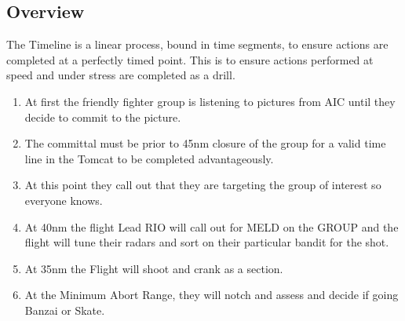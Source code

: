 
\subsection{Overview}



The Timeline is a linear process, bound in time segments, to ensure actions
are completed at a perfectly timed point. This is to ensure actions performed
at speed and under stress are completed as a drill.

\begin{enumerate}

  \item At first the friendly fighter group is listening to pictures from AIC
    until they decide to commit to the picture.

  \item The committal must be prior to 45nm closure of the group for a valid
    time line in the Tomcat to be completed advantageously.

  \item At this point they call out that they are targeting the group of
    interest so everyone knows.

  \item At 40nm the flight Lead RIO will call out for MELD on the GROUP and the
    flight will tune their radars and sort on their particular bandit for the
    shot.

  \item At 35nm the Flight will shoot and crank as a section.

  \item At the Minimum Abort Range, they will notch and assess and decide if
    going Banzai or Skate.

\end{enumerate}
